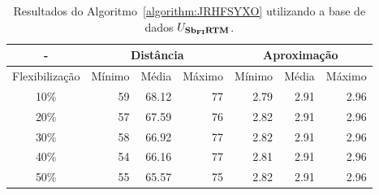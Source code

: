 \begin{table}[!htb]
  \caption{Resultados do Algoritmo~\ref{algorithm:JRHFSYXO} utilizando a base de dados $U_{\textbf{Sb\textsubscript{FI}RTM}}{}$.}
  \label{table:NKDEXOVQ}
  \centering
  \begin{tabular}{|c|r|r|r|r|r|r|}
    \hline
      -            & \multicolumn{3}{c|}{Distância}             & \multicolumn{3}{c|}{Aproximação}           \\ \hline
    Flexibilização & Mínimo       & Média        & Máximo       & Mínimo       & Média        & Máximo       \\ \hline  
    10\%           & 59           & 68.12        & 77           & 2.79         & 2.91         & 2.96         \\ \hline
    20\%           & 57           & 67.59        & 76           & 2.82         & 2.91         & 2.96         \\ \hline
    30\%           & 58           & 66.92        & 77           & 2.82         & 2.91         & 2.96         \\ \hline
    40\%           & 54           & 66.16        & 77           & 2.81         & 2.91         & 2.96         \\ \hline
    50\%           & 55           & 65.57        & 75           & 2.82         & 2.91         & 2.96         \\ \hline    
  \end{tabular}
\end{table}